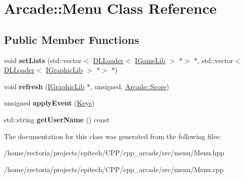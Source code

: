 \hypertarget{class_arcade_1_1_menu}{}\section{Arcade\+:\+:Menu Class Reference}
\label{class_arcade_1_1_menu}
\subsection*{Public Member Functions}
\begin{DoxyCompactItemize}
\item 
\mbox{\label{class_arcade_1_1_menu_a4d9fe370dd6f54072c84cc6b42ba7548}} 
void {\bfseries set\+Lists} (std\+::vector$<$ \hyperlink{class_d_l_loader}{D\+L\+Loader}$<$ \hyperlink{class_arcade_1_1_i_game_lib}{I\+Game\+Lib} $>$ $\ast$$>$ $\ast$, std\+::vector$<$ \hyperlink{class_d_l_loader}{D\+L\+Loader}$<$ \hyperlink{class_arcade_1_1_i_graphic_lib}{I\+Graphic\+Lib} $>$ $\ast$$>$ $\ast$)
\item 
\mbox{\label{class_arcade_1_1_menu_a0b980a97e7f7b9eabe27ea7e422af634}} 
void {\bfseries refresh} (\hyperlink{class_arcade_1_1_i_graphic_lib}{I\+Graphic\+Lib} $\ast$, unsigned, \hyperlink{class_arcade_1_1_score}{Arcade\+::\+Score})
\item 
\mbox{\label{class_arcade_1_1_menu_aec85eb1191a0f094c279485d49baa010}} 
unsigned {\bfseries apply\+Event} (\hyperlink{namespace_arcade_a9b501908b20bc993e4f8226db5323c41}{Keys})
\item 
\mbox{\label{class_arcade_1_1_menu_a55e14b8d591a0cbfed3f89a3f8e35a80}} 
std\+::string {\bfseries get\+User\+Name} () const
\end{DoxyCompactItemize}


The documentation for this class was generated from the following files\+:\begin{DoxyCompactItemize}
\item 
/home/rectoria/projects/epitech/\+C\+P\+P/cpp\+\_\+arcade/src/menu/Menu.\+hpp\item 
/home/rectoria/projects/epitech/\+C\+P\+P/cpp\+\_\+arcade/src/menu/Menu.\+cpp\end{DoxyCompactItemize}

